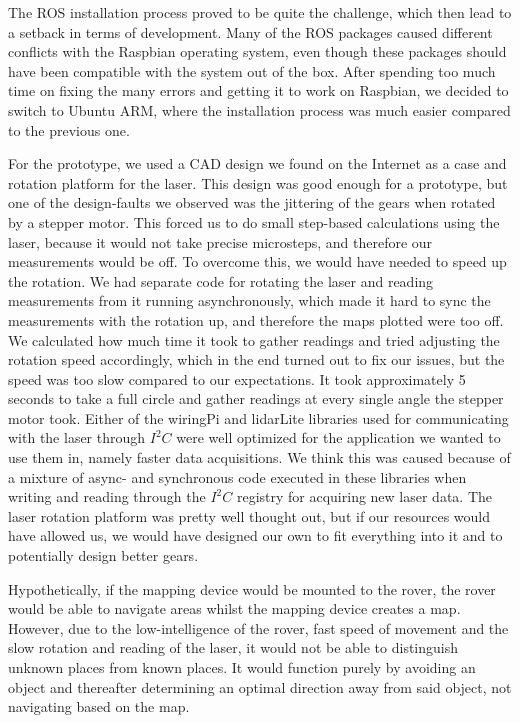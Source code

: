 The ROS installation process proved to be quite the challenge, which then lead to a setback in terms of development. Many of the ROS packages caused different conflicts with the Raspbian operating system, even though these packages should have been compatible with the system out of the box. After spending too much time on fixing the many errors and getting it to work on Raspbian, we decided to switch to Ubuntu ARM, where the installation process was much easier compared to the previous one.

For the prototype, we used a CAD design we found on the Internet as a case and rotation platform for the laser. This design was good enough for a prototype, but one of the design-faults we observed was the jittering of the gears when rotated by a stepper motor. This forced us to do small step-based calculations using the laser, because it would not take precise microsteps, and therefore our measurements would be off. To overcome this, we would have needed to speed up the rotation. We had separate code for rotating the laser and reading measurements from it running asynchronously, which made it hard to sync the measurements with the rotation up, and therefore the maps plotted were too off. We calculated how much time it took to gather readings and tried adjusting the rotation speed accordingly, which in the end turned out to fix our issues, but the speed was too slow compared to our expectations. It took approximately 5 seconds to take a full circle and gather readings at every single angle the stepper motor took. Either of the wiringPi and lidarLite libraries used for communicating with  the laser through $I^2C$ were well optimized for the application we wanted to use them in, namely faster data acquisitions. We think this was caused because of a mixture of async- and synchronous code executed in these libraries when writing and reading through the $I^2C$ registry for acquiring new laser data. The laser rotation platform was pretty well thought out, but if our resources would have allowed us, we would have designed our own to fit everything into it and to potentially design better gears.

Hypothetically, if the mapping device would be mounted to the rover, the rover would be able to navigate areas whilst the mapping device creates a map. However, due to the low-intelligence of the rover, fast speed of movement and the slow rotation and reading of the laser, it would not be able to distinguish unknown places from known places. It would function purely by avoiding an object and thereafter determining an optimal direction away from said object, not navigating based on the map. 

